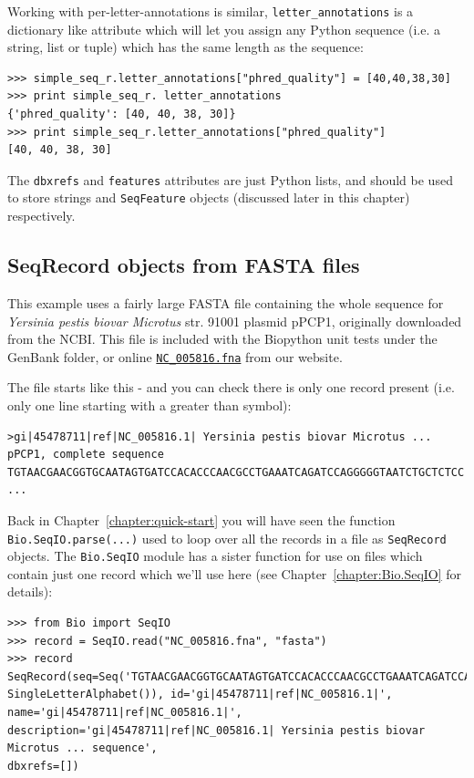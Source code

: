 \documentclass{report}
\begin{document}
Working with per-letter-annotations is similar, \verb|letter_annotations| is a
dictionary like attribute which will let you assign any Python sequence (i.e.
a string, list or tuple) which has the same length as the sequence:

\begin{verbatim}
>>> simple_seq_r.letter_annotations["phred_quality"] = [40,40,38,30]
>>> print simple_seq_r. letter_annotations
{'phred_quality': [40, 40, 38, 30]}
>>> print simple_seq_r.letter_annotations["phred_quality"]
[40, 40, 38, 30]
\end{verbatim}

The \verb|dbxrefs| and \verb|features| attributes are just Python lists, and
should be used to store strings and \verb|SeqFeature| objects (discussed later
in this chapter) respectively.


\subsection{SeqRecord objects from FASTA files}

This example uses a fairly large FASTA file containing the whole sequence for \textit{Yersinia pestis biovar Microtus} str. 91001 plasmid pPCP1, originally downloaded from the NCBI.  This file is included with the Biopython unit tests under the GenBank folder, or online \href{http://biopython.org/SRC/biopython/Tests/GenBank/NC_005816.fna}{\texttt{NC\_005816.fna}} from our website.

The file starts like this - and you can check there is only one record present (i.e. only one line starting with a greater than symbol):

\begin{verbatim}
>gi|45478711|ref|NC_005816.1| Yersinia pestis biovar Microtus ... pPCP1, complete sequence
TGTAACGAACGGTGCAATAGTGATCCACACCCAACGCCTGAAATCAGATCCAGGGGGTAATCTGCTCTCC
...
\end{verbatim}

Back in Chapter~\ref{chapter:quick-start} you will have seen the function \verb|Bio.SeqIO.parse(...)|
used to loop over all the records in a file as \verb|SeqRecord| objects. The \verb|Bio.SeqIO| module
has a sister function for use on files which contain just one record which we'll use here (see Chapter~\ref{chapter:Bio.SeqIO} for details):

\begin{verbatim}
>>> from Bio import SeqIO
>>> record = SeqIO.read("NC_005816.fna", "fasta")
>>> record
SeqRecord(seq=Seq('TGTAACGAACGGTGCAATAGTGATCCACACCCAACGCCTGAAATCAGATCCAGG...CTG',
SingleLetterAlphabet()), id='gi|45478711|ref|NC_005816.1|', name='gi|45478711|ref|NC_005816.1|',
description='gi|45478711|ref|NC_005816.1| Yersinia pestis biovar Microtus ... sequence',
dbxrefs=[])
\end{verbatim}
\end{document}
